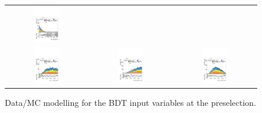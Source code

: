 \begin{figure}[htbp]
\begin{tabular}{@{}c c c@{}}
      \includegraphics[width=0.33\textwidth]{images/modelling_tmva_vars/plot_ditau_met_min_dphi_hh_tth.pdf} \\[4pt]
      \includegraphics[width=0.33\textwidth]{images/modelling_tmva_vars/plot_ratio01_hh_tth.pdf} &
      \includegraphics[width=0.33\textwidth]{images/modelling_tmva_vars/plot_ratio12_hh_tth.pdf} &
      \includegraphics[width=0.33\textwidth]{images/modelling_tmva_vars/plot_ratio13_hh_tth.pdf} 
    \end{tabular}
  
    \caption{Data/MC modelling for the \ttH BDT input variables at the \ttHtt preselection.}
    \label{tth_vars_modelling_2}
\end{figure}

